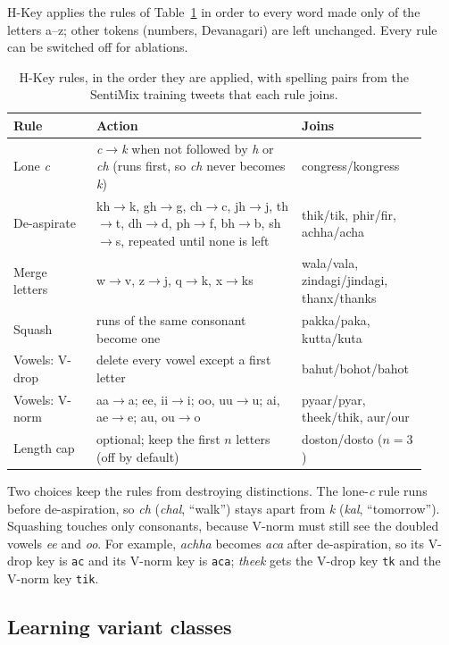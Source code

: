 H-Key applies the rules of Table~\ref{tab:hkey} in order to every word made only of the letters
a--z; other tokens (numbers, Devanagari) are left unchanged. Every rule can be switched off for
ablations.

\begin{table}[t]
\centering
\caption{H-Key rules, in the order they are applied, with spelling pairs from the SentiMix training
tweets that each rule joins.}
\label{tab:hkey}
\small
\begin{tabular}{@{}p{0.19\linewidth}p{0.47\linewidth}p{0.26\linewidth}@{}}
\toprule
Rule & Action & Joins \\
\midrule
Lone \textit{c} & \textit{c}$\to$\textit{k} when not followed by \textit{h} or \textit{ch}
  (runs first, so \textit{ch} never becomes \textit{k}) & congress/kongress \\
De-aspirate & kh$\to$k, gh$\to$g, ch$\to$c, jh$\to$j, th$\to$t, dh$\to$d, ph$\to$f, bh$\to$b,
  sh$\to$s, repeated until none is left & thik/tik, phir/fir, achha/acha \\
Merge letters & w$\to$v, z$\to$j, q$\to$k, x$\to$ks & wala/vala, zindagi/jindagi, thanx/thanks \\
Squash & runs of the same consonant become one & pakka/paka, kutta/kuta \\
Vowels: V-drop & delete every vowel except a first letter & bahut/bohot/bahot \\
Vowels: V-norm & aa$\to$a; ee, ii$\to$i; oo, uu$\to$u; ai, ae$\to$e; au, ou$\to$o & pyaar/pyar,
  theek/thik, aur/our \\
Length cap & optional; keep the first $n$ letters (off by default) & doston/dosto ($n=3$) \\
\bottomrule
\end{tabular}
\end{table}

Two choices keep the rules from destroying distinctions. The lone-\textit{c} rule runs before
de-aspiration, so \textit{ch} (\textit{chal}, ``walk'') stays apart from \textit{k}
(\textit{kal}, ``tomorrow''). Squashing touches only consonants, because V-norm must still see the
doubled vowels \textit{ee} and \textit{oo}. For example, \textit{achha} becomes \textit{aca} after
de-aspiration, so its V-drop key is \texttt{ac} and its V-norm key is \texttt{aca}; \textit{theek}
gets the V-drop key \texttt{tk} and the V-norm key \texttt{tik}.

\subsection{Learning variant classes}
\label{sec:variants}

